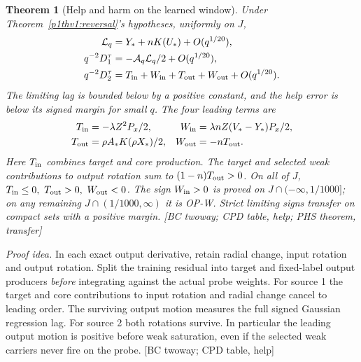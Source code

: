 \documentclass[10pt,twocolumn]{article}
\newtheorem{theorem}{Theorem}
\newcommand{\idea}{\par\noindent\emph{Proof idea.} }
\newcommand{\src}[1]{\textnormal{\small [#1]}}
\begin{document}
\begin{theorem}[Help and harm on the learned window]\label{p1thv1:channels}
Under Theorem~\ref{p1thv1:reversal}'s hypotheses, uniformly on \(J\),
\begin{align*}
 \mathcal L_q&=Y_*+nK(U_*)+O(q^{1/20}),\\
 q^{-2}D_1^\tau&=-\mathcal A_q\mathcal L_q/2+O(q^{1/20}),\\
 q^{-2}D_2^\tau&=T_{\rm in}+W_{\rm in}+T_{\rm out}+W_{\rm out}
                         +O(q^{1/20}).
\end{align*}
The limiting lag is bounded below by a positive constant, and the
help error is below its signed margin for small \(q\). The four
leading terms are
\begin{align*}
 T_{\rm in}&=-\lambda Z^2P_x/2,&
 W_{\rm in}&=\lambda nZ(V_*-Y_*)P_x/2,\\
 T_{\rm out}&=\rho A_*K(\rho X_*)/2,&
 W_{\rm out}&=-nT_{\rm out}.
\end{align*}
Here \(T_{\rm in}\) combines target and core production.
The target and selected weak contributions to output rotation sum
to \((1-n)T_{\rm out}>0\). On all of \(J\),
\(T_{\rm in}\le0,\ T_{\rm out}>0,\ W_{\rm out}<0\).
The sign \(W_{\rm in}>0\) is proved on \(J\cap(-\infty,1/1000]\);
on any remaining \(J\cap(1/1000,\infty)\) it is OP-W.
Strict limiting signs transfer on compact sets with a positive
margin. \src{BC twoway; CPD table, help; PHS theorem, transfer}
\end{theorem}
\idea In each exact output derivative, retain radial change, input
rotation and output rotation. Split the training residual into target
and fixed-label output producers \emph{before} integrating against
the actual probe weights. For source 1 the target and core contributions
to input rotation and radial change cancel to leading order.
The surviving output motion measures the full signed Gaussian
regression lag. For source 2 both rotations survive. In particular
the leading output motion is positive before weak saturation, even
if the selected weak carriers never fire on the probe.
\src{BC twoway; CPD table, help}
\end{document}
